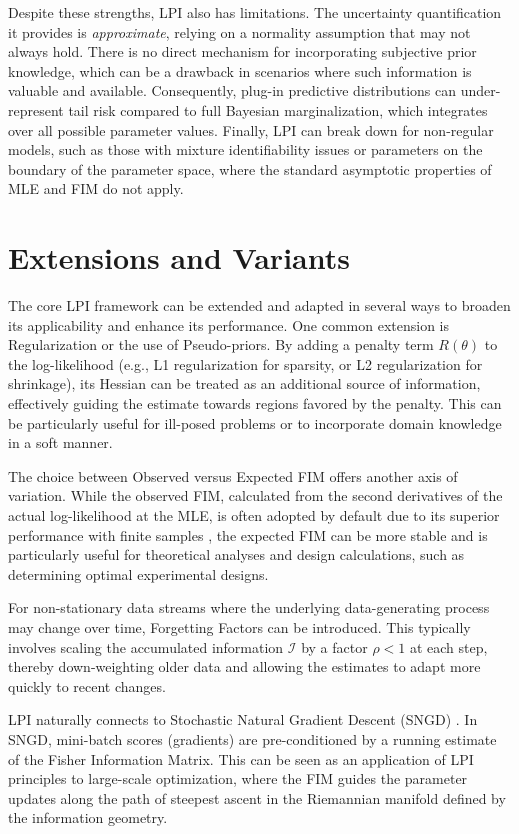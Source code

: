 \documentclass[11pt]{article}
\begin{document}
Despite these strengths, LPI also has limitations. The uncertainty quantification it provides is \textit{approximate}, relying on a normality assumption that may not always hold. There is no direct mechanism for incorporating subjective prior knowledge, which can be a drawback in scenarios where such information is valuable and available. Consequently, plug-in predictive distributions can under-represent tail risk compared to full Bayesian marginalization, which integrates over all possible parameter values. Finally, LPI can break down for non-regular models, such as those with mixture identifiability issues or parameters on the boundary of the parameter space, where the standard asymptotic properties of MLE and FIM do not apply.

\section{Extensions and Variants}
The core LPI framework can be extended and adapted in several ways to broaden its applicability and enhance its performance. One common extension is Regularization or the use of Pseudo-priors. By adding a penalty term $R(\theta)$ to the log-likelihood (e.g., L1 regularization \cite{tibshirani1996regression} for sparsity, or L2 regularization \cite{hoerl1970ridge} for shrinkage), its Hessian can be treated as an additional source of information, effectively guiding the estimate towards regions favored by the penalty. This can be particularly useful for ill-posed problems or to incorporate domain knowledge in a soft manner.

The choice between Observed versus Expected FIM offers another axis of variation. While the observed FIM, calculated from the second derivatives of the actual log-likelihood at the MLE, is often adopted by default due to its superior performance with finite samples \cite{efron1978assessing}, the expected FIM can be more stable and is particularly useful for theoretical analyses and design calculations, such as determining optimal experimental designs.

For non-stationary data streams where the underlying data-generating process may change over time, Forgetting Factors can be introduced. This typically involves scaling the accumulated information $\mathcal I$ by a factor $\rho < 1$ at each step, thereby down-weighting older data and allowing the estimates to adapt more quickly to recent changes.

LPI naturally connects to Stochastic Natural Gradient Descent (SNGD) \cite{pascanu2013revisiting}. In SNGD, mini-batch scores (gradients) are pre-conditioned by a running estimate of the Fisher Information Matrix. This can be seen as an application of LPI principles to large-scale optimization, where the FIM guides the parameter updates along the path of steepest ascent in the Riemannian manifold defined by the information geometry.
\end{document}
